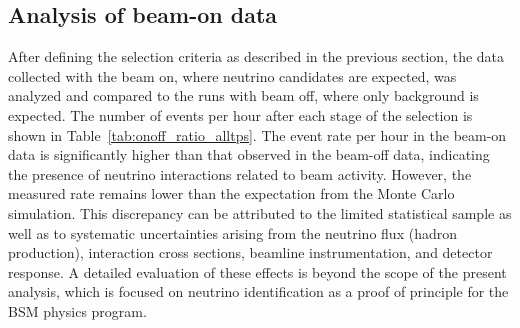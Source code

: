 
\subsection{Analysis of beam-on data}


\begin{table}[htbp]
\centering
{}
\caption{Beam-on and beam-off events per hour with the corresponding ratio for various selection cuts, considering all the available time with the spill on.}
\label{tab:onoff_ratio_alltps}
\end{table}

After defining the selection criteria as described in the previous section, the data collected with the beam on, where neutrino candidates are expected, 
was analyzed and compared to the runs with beam off, where only background is expected. The number of events per hour after each stage of the selection is shown 
in Table~\ref{tab:onoff_ratio_alltps}.
The event rate per hour in the beam-on data is significantly higher than that observed in the beam-off data, indicating the presence of neutrino interactions related to beam activity. 
However, the measured rate remains lower than the expectation from the Monte Carlo simulation. 
This discrepancy can be attributed to the limited statistical sample as well as to systematic uncertainties arising from the neutrino flux (hadron production), interaction cross sections, beamline instrumentation, and detector response. 
A detailed evaluation of these effects is beyond the scope of the present analysis, which is focused on neutrino identification as a proof of principle for the BSM physics program.

